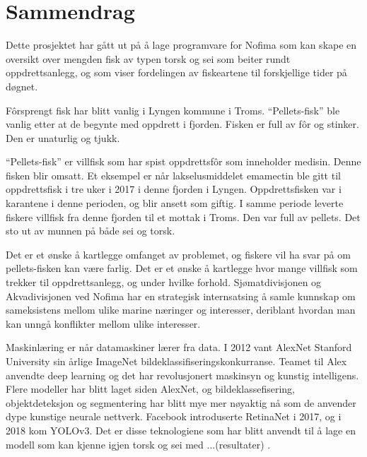 \section*{Sammendrag}




Dette prosjektet har gått ut på å lage programvare for Nofima som kan skape en oversikt over mengden fisk av typen torsk og sei som beiter rundt oppdrettsanlegg, og som viser fordelingen av fiskeartene til forskjellige tider på døgnet.

Fôrsprengt fisk har blitt vanlig i Lyngen kommune i Troms. ``Pellets-fisk” ble vanlig etter at de begynte med oppdrett i fjorden. Fisken er full av fôr og stinker. Den er unaturlig og tjukk.

``Pellets-fisk'' er villfisk som har spist oppdrettsfôr som inneholder medisin. Denne fisken blir omsatt. Et eksempel er når lakselusmiddelet emamectin ble gitt til oppdrettsfisk i tre uker i 2017 i denne fjorden i Lyngen. Oppdrettsfisken var i karantene i denne perioden, og blir ansett som giftig. I samme periode leverte fiskere villfisk fra denne fjorden til et mottak i Troms. Den var full av pellets. Det sto ut av munnen på både sei og torsk.

Det er et ønske å kartlegge omfanget av problemet, og fiskere vil ha svar på om pellets-fisken kan være farlig. Det er et ønske å kartlegge hvor mange villfisk som trekker til oppdrettsanlegg, og under hvilke forhold. Sjømatdivisjonen og Akvadivisjonen ved Nofima har en strategisk internsatsing å samle kunnskap om sameksistens mellom ulike marine næringer og interesser, deriblant hvordan man kan unngå konflikter mellom ulike interesser.


Maskinlæring er når datamaskiner lærer fra data. I 2012 vant AlexNet Stanford University sin årlige ImageNet bildeklassifiseringskonkurranse. Teamet til Alex anvendte deep learning og det har revolusjonert maskinsyn og kunstig intelligens. Flere modeller har blitt laget siden AlexNet, og bildeklassefisering, objektdeteksjon og segmentering har blitt mye mer nøyaktig nå som de anvender dype kunstige neurale nettverk. Facebook introduserte RetinaNet i 2017, og i 2018 kom YOLOv3. Det er disse teknologiene som har blitt anvendt til å lage en modell som kan kjenne igjen torsk og sei med ...(resultater) .

